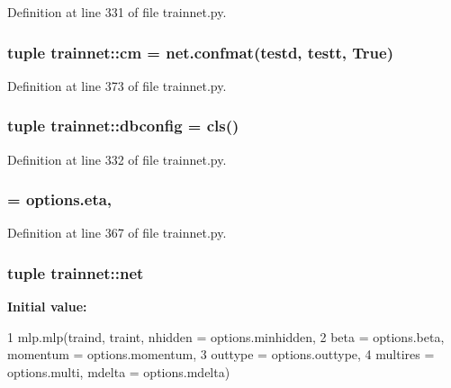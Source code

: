 Definition at line 331 of file trainnet.py.

\hypertarget{namespacetrainnet_afdfd7e6bbac45ccf3826d60cf8636299}{
\subsubsection[{cm}]{\setlength{\rightskip}{0pt plus 5cm}tuple {\bf trainnet::cm} = net.confmat(testd, testt, True)}}
\label{namespacetrainnet_afdfd7e6bbac45ccf3826d60cf8636299}


Definition at line 373 of file trainnet.py.

\hypertarget{namespacetrainnet_a293be6aa425ca070702d0f999f1ea68d}{
\subsubsection[{dbconfig}]{\setlength{\rightskip}{0pt plus 5cm}tuple {\bf trainnet::dbconfig} = {\bf cls}()}}
\label{namespacetrainnet_a293be6aa425ca070702d0f999f1ea68d}


Definition at line 332 of file trainnet.py.

\hypertarget{namespacetrainnet_a6eceefa845bebe7f22951cbc18af394b}{
\subsubsection[{eta}]{ = options.eta,}}
\label{namespacetrainnet_a6eceefa845bebe7f22951cbc18af394b}


Definition at line 367 of file trainnet.py.

\hypertarget{namespacetrainnet_afce55f5d26936ba4b8622fc19ba56446}{
\subsubsection[{net}]{\setlength{\rightskip}{0pt plus 5cm}tuple {\bf trainnet::net}}}
\label{namespacetrainnet_afce55f5d26936ba4b8622fc19ba56446}
{\bfseries Initial value:}
\begin{DoxyCode}
1 mlp.mlp(traind, traint, nhidden = options.minhidden, 
2                   beta = options.beta, momentum = options.momentum, 
3                   outtype = options.outtype, 
4                   multires = options.multi, mdelta = options.mdelta)
\end{DoxyCode}


